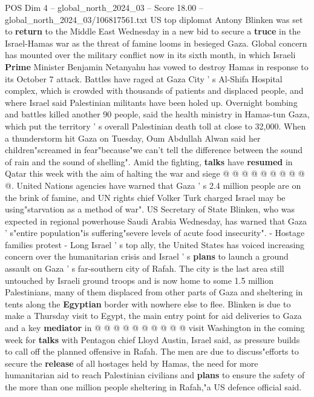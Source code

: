 \begin{textsample}{POS Dim 4 – global\_north\_2024\_03 – Score 18.00 – global\_north\_2024\_03/106817561.txt}  \label{ex:f4_pos_249}
US top diplomat Antony Blinken was set to \textbf{return} to the Middle East Wednesday in a new bid to secure a \textbf{truce} in the Israel-Hamas war as the threat of famine looms in besieged Gaza.
Global concern has mounted over the military conflict now in its sixth month, in which Israeli \textbf{Prime} Minister Benjamin Netanyahu has vowed to destroy Hamas in response to its October 7 attack.
Battles have raged at Gaza City ' s Al-Shifa Hospital complex, which is crowded with thousands of patients and displaced people, and where Israel said Palestinian militants have been holed up.
Overnight bombing and battles killed another 90 people, said the health ministry in Hamas-tun Gaza, which put the territory ' s overall Palestinian death toll at close to 32,000.
When a thunderstorm hit Gaza on Tuesday, Oum Abdullah Alwan said her children"screamed in fear"because"we can't tell the difference between the sound of rain and the sound of shelling".
Amid the fighting, \textbf{talks} have \textbf{resumed} in Qatar this week with the aim of halting the war and siege @ @ @ @ @ @ @ @ @ @.
United Nations agencies have warned that Gaza ' s 2.4 million people are on the brink of famine, and UN rights chief Volker Turk charged Israel may be using"starvation as a method of war".
US Secretary of State Blinken, who was expected in regional powerhouse Saudi Arabia Wednesday, has warned that Gaza ' s"entire population"is suffering"severe levels of acute food insecurity". - Hostage families protest - Long Israel ' s top ally, the United States has voiced increasing concern over the humanitarian crisis and Israel ' s \textbf{plans} to launch a ground assault on Gaza ' s far-southern city of Rafah.
The city is the last area still untouched by Israeli ground troops and is now home to some 1.5 million Palestinians, many of them displaced from other parts of Gaza and sheltering in tents along the \textbf{Egyptian} border with nowhere else to flee.
Blinken is due to make a Thursday visit to Egypt, the main entry point for aid deliveries to Gaza and a key \textbf{mediator} in @ @ @ @ @ @ @ @ @ @ visit Washington in the coming week for \textbf{talks} with Pentagon chief Lloyd Austin, Israel said, as pressure builds to call off the planned offensive in Rafah.
The men are due to discuss"efforts to secure the \textbf{release} of all hostages held by Hamas, the need for more humanitarian aid to reach Palestinian civilians and \textbf{plans} to ensure the safety of the more than one million people sheltering in Rafah,"a US defence official said.

\end{textsample}
